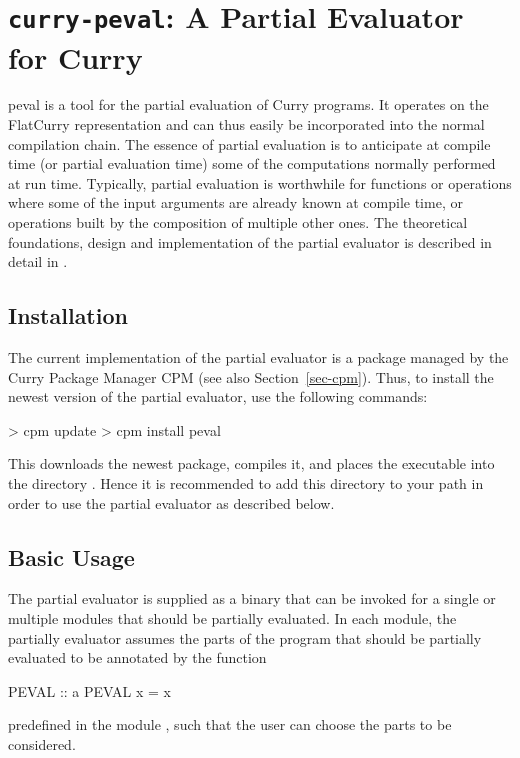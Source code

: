 \section{\texttt{curry-peval}: A Partial Evaluator for Curry}
\label{sec-peval}

peval
is a tool for the partial evaluation of Curry programs.
It operates on the FlatCurry representation and can thus
easily be incorporated into the normal compilation chain.
The essence of partial evaluation is to anticipate at compile time
(or partial evaluation time) some of the computations
normally performed at run time.
Typically, partial evaluation is worthwhile for functions or
operations where some of the input arguments are already known at compile time,
or operations built by the composition of multiple other ones.
The theoretical foundations, design and implementation of
the partial evaluator is described in detail in \cite{Peemoeller2016}.

\subsection{Installation}

The current implementation of the partial evaluator is a package
managed by the Curry Package Manager CPM
(see also Section~\ref{sec-cpm}).
Thus, to install the newest version of the partial evaluator,
use the following commands:
%
\begin{curry}
> cpm update
> cpm install peval
\end{curry}
%
This downloads the newest package, compiles it, and places
the executable  into the directory .
Hence it is recommended to add this directory to your path
in order to use the partial evaluator as described below.

\subsection{Basic Usage}

The partial evaluator is supplied as a binary that can be invoked
for a single or multiple modules that should be partially evaluated.
In each module, the partially evaluator assumes the parts of the program
that should be partially evaluated to be annotated by the function
\begin{curry}
PEVAL :: a
PEVAL x = x
\end{curry}
predefined in the module ,
such that the user can choose the parts to be considered.

